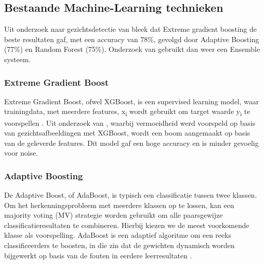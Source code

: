 \subsection{Bestaande Machine-Learning technieken}
Uit onderzoek naar gezichtsdetectie van \textcite{Sanil2023} bleek dat Extreme gradient boosting de beste resultaten gaf, met een accuracy van 78\%, gevolgd door Adaptive Boosting (77\%) en Random Forest (75\%). Onderzoek van \autocite{Khan2017} gebruikt dan weer een Ensemble systeem. 

\subsubsection{Extreme Gradient Boost}
\label{subsub:vxgboost}
Extreme Gradient Boost, ofwel XGBoost, is een supervised learning model, waar trainingdata, met meerdere features, x\textsubscript{i} wordt gebruikt om target waarde y\textsubscript{i} te voorspellen \autocite{XGBoost2023}. Uit onderzoek van \autocite{Chen2023}, waarbij vermoeidheid werd voorspeld op basis van gezichtsafbeeldingen met XGBoost, wordt een boom aangemaakt op basis van de geleverde features. Dit model gaf een hoge accuracy en is minder gevoelig voor noise. 

\subsubsection{Adaptive Boosting}
\label{subsub:vadaboost}
De Adaptive Boost, of AdaBoost, is typisch een classificatie tussen twee klassen. Om het herkenningsprobleem met meerdere klassen op te lossen, kan een majority voting (MV) strategie worden gebruikt om alle paarsgewijze classificatieresultaten te combineren. Hierbij kiezen we de meest voorkomende klasse als voorspelling. AdaBoost is een adaptief algoritme om een reeks classificeerders te boosten, in die zin dat de gewichten dynamisch worden bijgewerkt op basis van de fouten in eerdere leerresultaten \autocite{Guo2001}.

